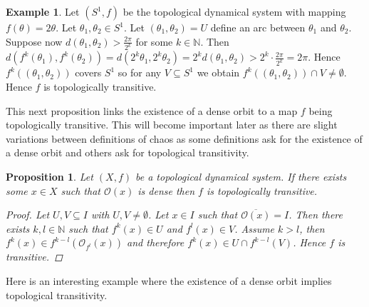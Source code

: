 \documentclass[11pt,a4paper,oneside]{memoir}
\theoremstyle{plain}
\newtheorem{prop}[thm]{Proposition}
\theoremstyle{definition}
\newtheorem{exmp}[thm]{Example}
\begin{document}
\begin{exmp}
    Let $(S^1, f)$ be the topological dynamical system with mapping $f(\theta) = 2\theta$. Let $\theta_1, \theta_2 \in S^1$. Let $(\theta_1, \theta_2) = U$ define an arc between $\theta_1$ and $\theta_2$. Suppose now $d\left(\theta_1, \theta_2\right) > \frac{2\pi}{2^k}$ for some $k \in \mathbb{N}$. Then $d\left( f^k(\theta_1), f^k(\theta_2)\right) = d\left( 2^k\theta_1, 2^k\theta_2 \right) = 2^k d\left( \theta_1, \theta_2 \right) > 2^k \cdot \frac{2\pi}{2^k} = 2\pi$. Hence $f^k((\theta_1, \theta_2))$ covers $S^1$ so for any $V \subseteq S^1$ we obtain $f^k((\theta_1, \theta_2)) \cap V \neq \emptyset$. Hence $f$ is topologically transitive.
\end{exmp}

This next proposition links the existence of a dense orbit to a map $f$ being topologically transitive. This will become important later as there are slight variations between definitions of chaos as some definitions ask for the existence of a dense orbit and others ask for topological transitivity.

\begin{prop} \label{prop:dense-transitive}
    Let $(X, f)$ be a topological dynamical system. If there exists some $x \in X$ such that $\mathcal{O}(x)$ is dense then $f$ is topologically transitive.
    \begin{proof}
        Let $U, V \subseteq I$ with $U, V \neq \emptyset$. Let $x \in I$ such that $\overline{\mathcal{O}(x)} = I$. Then there exists $k, l \in \mathbb{N}$ such that $f^k(x) \in U$ and $f^l(x) \in V$. Assume $k > l$, then $f^k(x) \in f^{k - l}\left( \mathcal{O}_{f^l}(x) \right)$ and therefore $f^k(x) \in U \cap f^{k-l}(V)$. Hence $f$ is transitive.
    \end{proof}
\end{prop}

Here is an interesting example where the existence of a dense orbit implies topological transitivity.
\end{document}
